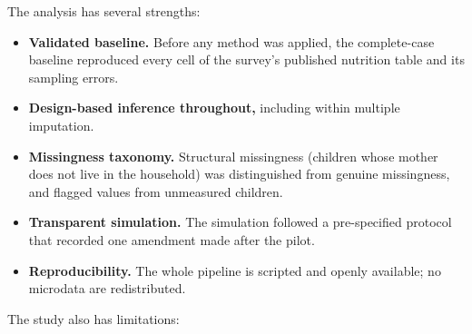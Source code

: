 \documentclass[11pt,a4paper]{article}
\providecommand{\tightlist}{\setlength{\itemsep}{0pt}\setlength{\parskip}{0pt}}
\begin{document}
The analysis has several strengths:

\begin{itemize}
\tightlist
\item
  \textbf{Validated baseline.} Before any method was applied, the
  complete-case baseline reproduced every cell of the survey's published
  nutrition table and its sampling errors.
\item
  \textbf{Design-based inference throughout,} including within multiple
  imputation.
\item
  \textbf{Missingness taxonomy.} Structural missingness (children whose
  mother does not live in the household) was distinguished from genuine
  missingness, and flagged values from unmeasured children.
\item
  \textbf{Transparent simulation.} The simulation followed a
  pre-specified protocol that recorded one amendment made after the
  pilot.
\item
  \textbf{Reproducibility.} The whole pipeline is scripted and openly
  available; no microdata are redistributed.
\end{itemize}

The study also has limitations:
\end{document}
